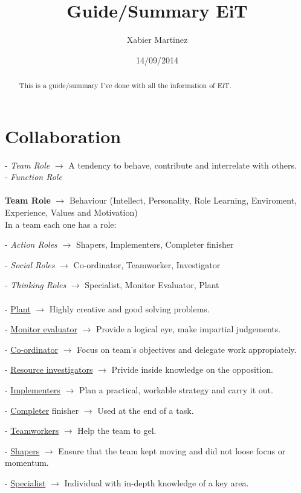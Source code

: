 \documentclass[11pt,a4paper]{article}
\author{Xabier Martinez}
\title{Guide/Summary EiT}
\date{14/09/2014}
\begin{document}
\maketitle
\begin{abstract}
\begin{center}
This is a guide/summary I've done with all the information of EiT.
\end{center}
\end{abstract}
\section{Collaboration}
- \emph{Team Role} $\to$ A tendency to behave, contribute and interrelate with others.\\
- \emph{Function Role}\\ \\
\textbf{Team Role} $\to$ Behaviour (Intellect, Personality, Role Learning, Enviroment, Experience, Values and Motivation)\\
In a team each one has a role:

	- \emph{Action Roles} $\to$ Shapers, Implementers, Completer finisher
	
	- \emph{Social Roles} $\to$ Co-ordinator, Teamworker, Investigator
	
	- \emph{Thinking Roles} $\to$ Specialist, Monitor Evaluator, Plant\\ \\

- \underline{Plant} $\to$ Highly creative and good solving problems.

- \underline{Monitor evaluator} $\to$ Provide a logical eye, make impartial judgements.

- \underline{Co-ordinator} $\to$ Focus on team's objectives and delegate work appropiately.

- \underline{Resource investigators} $\to$ Privide inside knowledge on the opposition.

- \underline{Implementers} $\to$ Plan a practical, workable strategy and carry it out.

- \underline{Completer} finisher $\to$ Used at the end of a task.

- \underline{Teamworkers} $\to$ Help the team to gel.

- \underline{Shapers} $\to$ Ensure that the team kept moving and did not loose focus or momentum.

- \underline{Specialist} $\to$ Individual with in-depth knowledge of a key area.\\ \\
\end{document}
